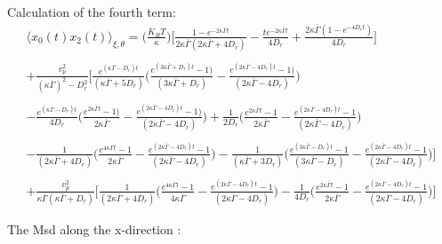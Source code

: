 \documentclass[]{article}
\begin{document}
Calculation of the fourth term:
\newline
\begin{multline*}
\langle x_{0}(t)x_{2}(t)\rangle_{\xi,\theta} = \bigg(\frac{K_BT}{\kappa} \bigg)\bigg[ \frac{1-e^{-2\kappa \bar \Gamma t}}{2\kappa\bar \Gamma(2\kappa\bar \Gamma+4D_r)}-\frac{te^{-2\kappa \bar \Gamma t}}{4D_r}+\frac{2\kappa\bar \Gamma(1-e^{-4D_rt})}{4D_r} \bigg]
\\ \\ +\frac{v_p^2}{(\kappa \bar \Gamma)^2-D_r^2}\bigg [\frac{e^{(\kappa \bar \Gamma-D_r)t}}{(\kappa \bar \Gamma+5D_r)}\bigg(\frac{e^{(3\kappa \bar \Gamma+D_r)t}-1)}{(3\kappa \bar \Gamma+D_r)}-\frac{e^{(2\kappa \bar \Gamma-4D_r)t}-1)}{(2\kappa \bar \Gamma-4D_r)}\bigg)\\ \\-\frac{e^{(\kappa \bar \Gamma-D_r)t}}{4D_r}\bigg(\frac{e^{2\kappa \bar \Gamma t}-1)}{2\kappa \bar \Gamma}-\frac{e^{(2\kappa \bar \Gamma-4D_r)t}-1)}{(2\kappa \bar \Gamma-4D_r)}\bigg)
 +\frac{1}{2D_r}\bigg(\frac{e^{2\kappa \bar \Gamma t}-1}{2\kappa \bar \Gamma}-\frac{e^{(2\kappa \bar \Gamma-4D_r)t}-1}{(2\kappa \bar \Gamma-4D_r)}\bigg)\\ \\ -\frac{1}{(2\kappa \bar \Gamma +4D_r)}\bigg(\frac{e^{4\kappa \bar \Gamma t}-1}{2\kappa \bar \Gamma}-\frac{e^{(2\kappa \bar \Gamma-4D_r)t}-1}{(2\kappa \bar \Gamma-4D_r)}\bigg) -\frac{1}{(\kappa \bar \Gamma +3D_r)}\bigg(\frac{e^{(3\kappa \bar \Gamma-D_r) t}-1}{(3\kappa \bar \Gamma-D_r)}-\frac{e^{(2\kappa \bar \Gamma-4D_r)t}-1}{(2\kappa \bar \Gamma-4D_r)}\bigg)\bigg]\\ \\+\frac{v_p^2}{\kappa \bar \Gamma(\kappa \bar \Gamma+D_r)}\bigg[\frac{1}{(2\kappa \bar \Gamma+4D_r )}\bigg(\frac{e^{4\kappa \bar \Gamma t}-1}{4\kappa \bar \Gamma}-\frac{e^{(2\kappa \bar \Gamma-4D_r)t}-1}{(2\kappa \bar \Gamma-4D_r)}\bigg)-\frac{1}{4D_r}\bigg(\frac{e^{2\kappa \bar \Gamma t}-1}{2\kappa \bar \Gamma}-\frac{e^{(2\kappa \bar \Gamma-4D_r)t}-1}{(2\kappa \bar \Gamma-4D_r)}\bigg)\bigg]
\end{multline*}

\clearpage
The Msd along the x-direction :
\end{document}
